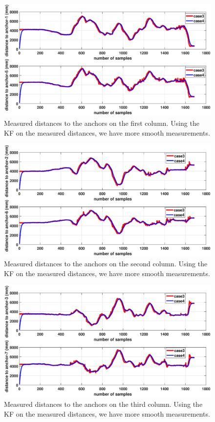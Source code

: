 \documentclass{article}
\begin{document}
\begin{figure}[thpb]
\centering
\includegraphics[scale=0.4]{Pics/Fig_logged/dist_15.eps}
\caption{Measured distances to the anchors on the first column. Using the KF on the measured distances, we have more smooth measurements.}
\label{Fig_logged_05}
\end{figure}

\begin{figure}[thpb]
\centering
\includegraphics[scale=0.4]{Pics/Fig_logged/dist_26.eps}
\caption{Measured distances to the anchors on the second column. Using the KF on the measured distances, we have more smooth measurements.}
\label{Fig_logged_06}
\end{figure}

\begin{figure}[thpb]
\centering
\includegraphics[scale=0.4]{Pics/Fig_logged/dist_37.eps}
\caption{Measured distances to the anchors on the third column. Using the KF on the measured distances, we have more smooth measurements.}
\label{Fig_logged_07}
\end{figure}
\end{document}
